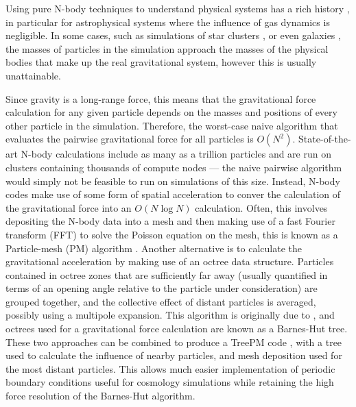\documentclass[11pt,twoside]{article}
\begin{document}
Using pure N-body techniques to understand physical systems has a rich history \citep[see e.g.\ ][]{holmberg1941, hoerner1960, peebles1970, press1974}, in particular for astrophysical systems where the influence of gas dynamics is negligible. In some cases, such as simulations of star clusters \citep{wang2016}, or even galaxies \citep{bedorf2014}, the masses of particles in the simulation approach the masses of the physical bodies that make up the real gravitational system, however this is usually unattainable.

Since gravity is a long-range force, this means that the gravitational force calculation for any given particle depends on the masses and positions of every other particle in the simulation. Therefore, the worst-case naive algorithm that evaluates the pairwise gravitational force for all particles is $O(N^2)$. State-of-the-art N-body calculations include as many as a trillion particles and are run on clusters containing thousands of compute nodes --- the naive pairwise algorithm would simply not be feasible to run on simulations of this size. Instead, N-body codes make use of some form of spatial acceleration to conver the calculation of the gravitational force into an $O(N \log N)$ calculation. Often, this involves depositing the N-body data into a mesh and then making use of a fast Fourier transform (FFT) to solve the Poisson equation on the mesh, this is known as a Particle-mesh (PM) algorithm \citep{hockney1988}. Another alternative is to calculate the gravitational acceleration by making use of an octree data structure. Particles contained in octree zones that are sufficiently far away (usually quantified in terms of an opening angle relative to the particle under consideration) are grouped together, and the collective effect of distant particles is averaged, possibly using a multipole expansion. This algorithm is originally due to \citet{barnes1986}, and octrees used for a gravitational force calculation are known as a Barnes-Hut tree. These two approaches can be combined to produce a TreePM code \citep{bagla2002}, with a tree used to calculate the influence of nearby particles, and mesh deposition used for the most distant particles. This allows much easier implementation of periodic boundary conditions useful for cosmology simulations while retaining the high force resolution of the Barnes-Hut algorithm.
\end{document}
